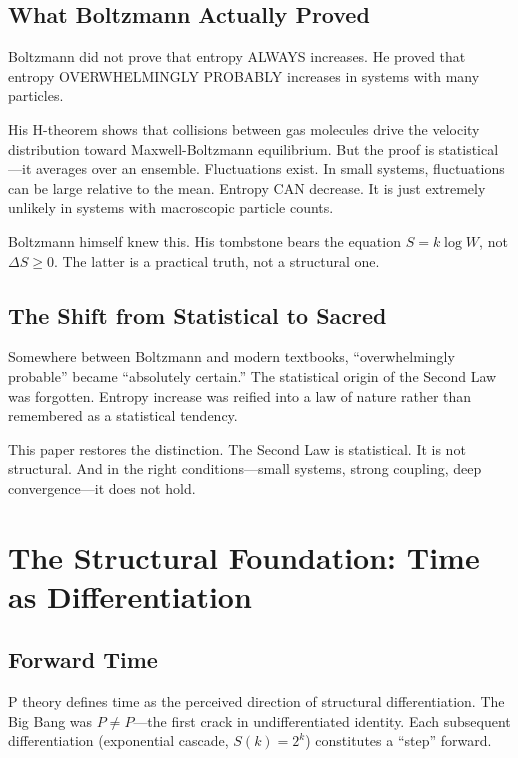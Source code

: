 \documentclass[12pt,a4paper]{article}
\begin{document}
\subsection{What Boltzmann Actually Proved}

Boltzmann did not prove that entropy ALWAYS increases. He proved that entropy OVERWHELMINGLY PROBABLY increases in systems with many particles.

His H-theorem shows that collisions between gas molecules drive the velocity distribution toward Maxwell-Boltzmann equilibrium. But the proof is statistical---it averages over an ensemble. Fluctuations exist. In small systems, fluctuations can be large relative to the mean. Entropy CAN decrease. It is just extremely unlikely in systems with macroscopic particle counts.

Boltzmann himself knew this. His tombstone bears the equation $S = k \log W$, not $\Delta S \geq 0$. The latter is a practical truth, not a structural one.

\subsection{The Shift from Statistical to Sacred}

Somewhere between Boltzmann and modern textbooks, ``overwhelmingly probable'' became ``absolutely certain.'' The statistical origin of the Second Law was forgotten. Entropy increase was reified into a law of nature rather than remembered as a statistical tendency.

This paper restores the distinction. The Second Law is statistical. It is not structural. And in the right conditions---small systems, strong coupling, deep convergence---it does not hold.

\section{The Structural Foundation: Time as Differentiation}

\subsection{Forward Time}

P theory defines time as the perceived direction of structural differentiation. The Big Bang was $P \neq P$---the first crack in undifferentiated identity. Each subsequent differentiation (exponential cascade, $S(k)=2^k$) constitutes a ``step'' forward.
\end{document}
